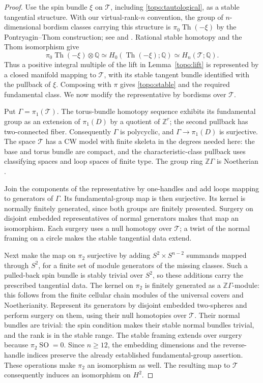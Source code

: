\documentclass[11pt]{article}
\numberwithin{equation}{section}
\theoremstyle{definition}
\theoremstyle{remark}
\begin{document}
\begin{proof}
Use the spin bundle $\xi$ on $\mathscr T$, including
\eqref{topo:tautological}, as a stable tangential structure.
With our virtual-rank-$n$ convention, the group of $n$-dimensional
bordism classes carrying this structure is
$\pi_0\operatorname{Th}(-\xi)$ by the Pontryagin--Thom construction;
see \cite{Thom1954} and \cite[Section~2.3]{RathelFournier2024}.
Rational stable homotopy and the Thom isomorphism give
\[
 \pi_0\operatorname{Th}(-\xi)\otimes\mathbb Q
 \simeq H_0(\operatorname{Th}(-\xi);\mathbb Q)
 \simeq H_n(\mathscr T;\mathbb Q).
\]
Thus a positive integral multiple of the lift in Lemma~\ref{topo:lift}
is represented
by a closed manifold mapping to $\mathscr T$, with its stable tangent
bundle identified with the pullback of $\xi$.  Composing with $\pi$
gives \eqref{topo:stable} and the required fundamental class.  We now
modify the representative by bordisms over $\mathscr T$.

Put $\Gamma=\pi_1(\mathscr T)$.  The torus-bundle homotopy sequence
exhibits its fundamental group as an extension of $\pi_1(D)$ by a
quotient of $\mathbb Z^r$; the second pullback has two-connected fiber.
Consequently $\Gamma$ is polycyclic, and $\Gamma\to\pi_1(D)$ is
surjective.  The space $\mathscr T$ has a CW model with finite skeleta
in the degrees needed here: the base and torus bundle are compact,
and the characteristic-class pullback uses classifying spaces and
loop spaces of finite type.  The group ring $\mathbb Z\Gamma$ is
Noetherian \cite{Hall1954}.

Join the components of the representative by one-handles and add
loops mapping to generators of $\Gamma$.  Its fundamental-group map
is then surjective.  Its kernel is normally finitely generated,
since both groups are finitely presented.  Surgery on disjoint
embedded representatives of normal generators makes that map an
isomorphism.  Each surgery uses a null homotopy over $\mathscr T$;
a twist of the normal framing on a circle makes the stable tangential
data extend.

Next make the map on $\pi_2$ surjective by adding
$S^2\times S^{n-2}$ summands mapped through $S^2$, for a finite set
of module generators of the missing classes.  Such a pulled-back
spin bundle is stably trivial over $S^2$, so these additions carry
the prescribed tangential data.  The kernel on $\pi_2$ is finitely
generated as a $\mathbb Z\Gamma$-module: this follows from the finite
cellular chain modules of the universal covers and Noetherianity.
Represent its generators by disjoint embedded two-spheres and
perform surgery on them, using their null homotopies over
$\mathscr T$.  Their normal bundles are trivial: the spin condition
makes their stable normal bundles trivial, and the rank is in the
stable range.  The stable framing extends over surgery because
$\pi_2\operatorname{SO}=0$.  Since $n\geq12$, the embedding dimensions and the
reverse-handle indices preserve the already established
fundamental-group assertion.  These operations make $\pi_2$ an
isomorphism as well.  The resulting map to $\mathscr T$ consequently
induces an isomorphism on $H^2$.


\end{proof}
\end{document}
